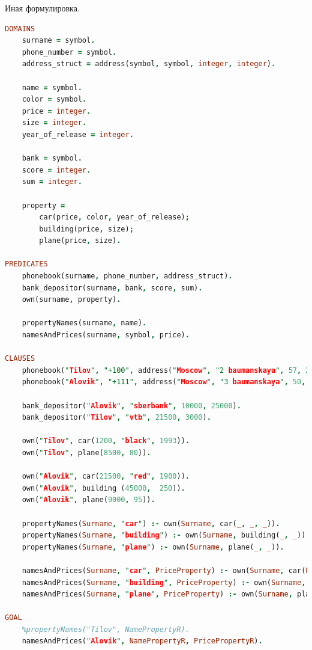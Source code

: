 \documentclass[a4paper,oneside,12pt]{extreport}
\begin{document}
\begin{task}
    Иная формулировка.

    \begin{lstlisting}[language=Prolog]
DOMAINS 
    surname = symbol.
    phone_number = symbol.
    address_struct = address(symbol, symbol, integer, integer).

    name = symbol.
    color = symbol.
    price = integer.
    size = integer.
    year_of_release = integer.
    
    bank = symbol.
    score = integer.
    sum = integer.
    
    property = 
        car(price, color, year_of_release);
        building(price, size);
        plane(price, size).

PREDICATES
    phonebook(surname, phone_number, address_struct).
    bank_depositor(surname, bank, score, sum).
    own(surname, property).
    
    propertyNames(surname, name).
    namesAndPrices(surname, symbol, price).

CLAUSES
    phonebook("Tilov", "+100", address("Moscow", "2 baumanskaya", 57, 25)).
    phonebook("Alovik", "+111", address("Moscow", "3 baumanskaya", 50, 75)).
    
    bank_depositor("Alovik", "sberbank", 10000, 25000).
    bank_depositor("Tilov", "vtb", 21500, 3000).

    own("Tilov", car(1200, "black", 1993)).
    own("Tilov", plane(8500, 80)).
    
    own("Alovik", car(21500, "red", 1900)).
    own("Alovik", building (45000,  250)).
    own("Alovik", plane(9000, 95)).
    
    propertyNames(Surname, "car") :- own(Surname, car(_, _, _)).
    propertyNames(Surname, "building") :- own(Surname, building(_, _)).
    propertyNames(Surname, "plane") :- own(Surname, plane(_, _)).
        
    namesAndPrices(Surname, "car", PriceProperty) :- own(Surname, car(PriceProperty, _, _)).
    namesAndPrices(Surname, "building", PriceProperty) :- own(Surname, building(PriceProperty, _)).
    namesAndPrices(Surname, "plane", PriceProperty) :- own(Surname, plane(PriceProperty, _)).

GOAL
    %propertyNames("Tilov", NamePropertyR).
    namesAndPrices("Alovik", NamePropertyR, PricePropertyR).
    \end{lstlisting}

\end{task}
\end{document}
